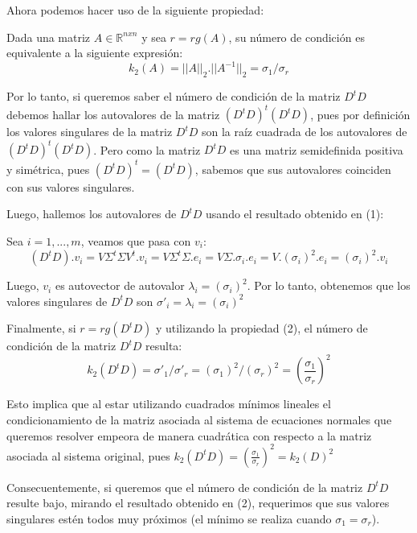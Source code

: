 Ahora podemos hacer uso de la siguiente propiedad:

Dada una matriz $A \in  \mathbb{R}^{nxn}$ y sea $r = rg(A)$, su número de condición es equivalente a la siguiente expresión:
\begin{equation}
    k_{2}(A) = || A ||_{2} . || A^{-1} ||_{2} = \sigma_{1}/\sigma_{r}
\end{equation}

Por lo tanto, si queremos saber el número de condición de la matriz $D^{t}D$
debemos hallar los autovalores de la matriz $(D^{t}D)^{t}(D^{t}D)$,
pues por definición los valores singulares de la matriz $D^{t}D$
son la raíz cuadrada de los autovalores de $(D^{t}D)^{t}(D^{t}D)$.
Pero como la matriz $D^{t}D$ es una matriz semidefinida positiva y  simétrica, pues $(D^{t}D)^{t} = (D^{t}D)$,
sabemos que sus autovalores coinciden con sus valores singulares.

Luego, hallemos los autovalores de $D^{t}D$ usando el resultado obtenido en (1):

Sea $i = 1, ... , m$, veamos que pasa con $v_{i}$:
\begin{equation*}
    (D^{t}D).v_{i} = V \Sigma^{t}\Sigma V^{t}.v_{i} = V\Sigma^{t}\Sigma .e_{i} = 
    V\Sigma .\sigma_{i}.e_{i} = V.(\sigma_{i})^{2}.e_{i} = (\sigma_{i})^{2}.v_{i}
\end{equation*}

Luego, $v_{i}$ es autovector de autovalor $\lambda_{i} = (\sigma_{i})^{2}$.
Por lo tanto, obtenemos que los valores singulares de $D^{t}D$ son $\sigma\prime_{i} = \lambda_{i} = (\sigma_{i})^{2} $

Finalmente, si $r = rg(D^{t}D)$ y utilizando la propiedad (2), el número de condición de la matriz $D^{t}D$ resulta:
\begin{equation*}
     k_{2}(D^{t}D) =  \sigma\prime_{1}/\sigma\prime_{r} = (\sigma_{1})^{2}/(\sigma_{r})^{2} = (\frac{\sigma_{1}}{\sigma_{r}})^{2} 
\end{equation*}

Esto implica que al estar utilizando cuadrados m\'inimos lineales el condicionamiento de la matriz asociada al sistema de ecuaciones normales que queremos resolver empeora de manera cuadr\'atica con respecto a la matriz asociada al sistema original, pues $k_{2}(D^{t}D) = (\frac{\sigma_{1}}{\sigma_{r}})^{2} = k_{2}(D)^{2}$

Consecuentemente, si queremos que el número de condición de la matriz $D^{t}D$ resulte bajo, mirando el resultado obtenido en (2), requerimos que sus valores singulares estén todos muy próximos (el mínimo se realiza cuando $\sigma_{1} = \sigma_{r}$). 


